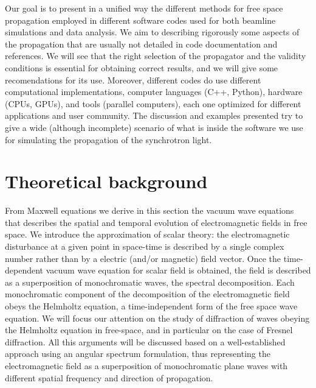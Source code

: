 \documentclass{iucr}              %
\begin{document}
Our goal is to present in a unified way the different methods for free space propagation employed in different software codes used for both beamline simulations and data analysis. We aim to describing rigorously some aspects of the propagation that are usually not detailed in code documentation and references. We will see that the right selection of the propagator and the validity conditions is essential for obtaining correct results, and we will give some recomendations for its use. Moreover, different codes do use different computational implementations, computer languages (C++, Python), hardware (CPUs, GPUs), and tools (parallel computers), each one optimized for different applications and user community. The discussion and examples presented try to give a wide (although incomplete) scenario of what is inside the software we use for simulating the propagation of the synchrotron light.   

\section{Theoretical background}
\label{ch: theory}

From Maxwell equations we derive in this section the vacuum wave equations that describes the spatial and temporal evolution of electromagnetic fields in free space. We introduce the approximation of scalar theory: the electromagnetic disturbance at a given point in space-time is described by a single complex number rather than by a electric (and/or magnetic) field vector. Once the time-dependent vacuum wave equation for scalar field is obtained, the field is described as a superposition of monochromatic waves, the spectral decomposition. Each monochromatic component of the decomposition of the electromagnetic field obeys the Helmholtz equation, a time-independent form of the free space wave equation. We will focus our attention on the study of diffraction of waves obeying the Helmholtz equation in free-space, and in particular on the case of Fresnel diffraction. All this arguments will be discussed based on a well-established approach \cite{paganin_book} using an angular spectrum formulation, thus representing the electromagnetic field as a superposition of monochromatic plane waves with different spatial frequency and direction of propagation. 
\end{document}
